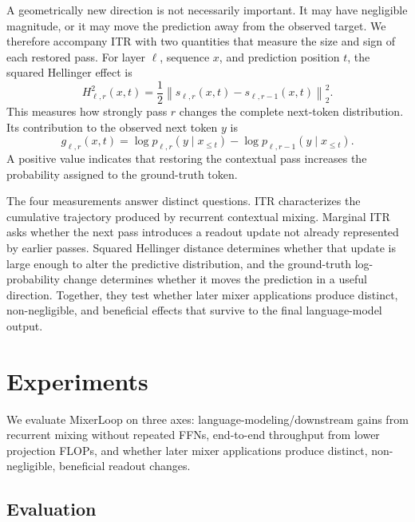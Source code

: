 \documentclass[letterpaper]{article} %
\begin{document}
A geometrically new direction is not necessarily important. It may have
negligible magnitude, or it may move the prediction away from the observed
target. We therefore accompany ITR with two quantities that measure the size
and sign of each restored pass. For layer $\ell$, sequence $x$, and prediction
position $t$, the squared Hellinger effect is
\begin{equation}
H_{\ell,r}^2(x,t)
=\frac{1}{2}
\left\|s_{\ell,r}(x,t)-s_{\ell,r-1}(x,t)\right\|_2^2.
\label{eq:hellinger}
\end{equation}
This measures how strongly pass $r$ changes the complete next-token
distribution. Its contribution to the observed next token $y$ is
\begin{equation}
g_{\ell,r}(x,t)
=\log p_{\ell,r}(y\mid x_{\leq t})-
\log p_{\ell,r-1}(y\mid x_{\leq t}).
\label{eq:true_token_gain}
\end{equation}
A positive value indicates that restoring the contextual pass increases the
probability assigned to the ground-truth token.

The four measurements answer distinct questions. ITR characterizes the
cumulative trajectory produced by recurrent contextual mixing. Marginal ITR
asks whether the next pass introduces a readout update not already represented
by earlier passes. Squared Hellinger distance determines whether that update is
large enough to alter the predictive distribution, and the ground-truth
log-probability change determines whether it moves the prediction in a useful
direction. Together, they test whether later mixer applications produce
distinct, non-negligible, and beneficial effects that survive to the final
language-model output.




\section{Experiments}
\label{sec:experiments}

We evaluate MixerLoop on three axes: language-modeling/downstream gains from
recurrent mixing without repeated FFNs, end-to-end throughput from lower
projection FLOPs, and whether later mixer applications produce distinct,
non-negligible, beneficial readout changes.

\subsection{Evaluation}
\end{document}
